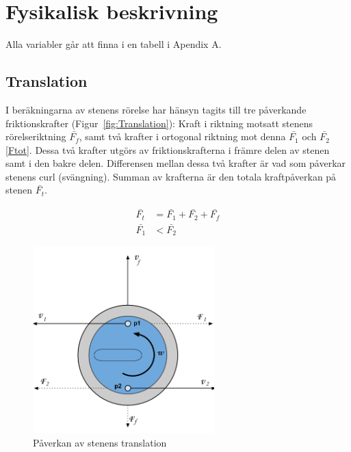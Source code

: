 \documentclass[11pt]{article} %
\begin{document}
\pagebreak

\section{Fysikalisk beskrivning} 

Alla variabler går att finna i en tabell i Apendix A.

\subsection{Translation}

I beräkningarna av stenens rörelse har hänsyn tagits till tre påverkande friktionskrafter (Figur~\ref{fig:Translation}): Kraft i riktning motsatt stenens rörelseriktning $\bar{F_f}$, samt två krafter i ortogonal riktning mot denna $\bar{F_1}$ och $\bar{F_2}$ \eqref{Ftot}. Dessa två krafter utgörs av friktionskrafterna i främre delen av stenen samt i den bakre delen. Differensen mellan dessa två krafter är vad som påverkar stenens curl (svängning). Summan av krafterna är den totala kraftpåverkan på stenen $\bar{F_t}$.

\begin{subequations}\label{Ftot}
 \begin{align}
 \bar{F_t}&=\bar{F_1}+\bar{F_2}+\bar{F_f}\\
 \bar{F_1}&<\bar{F_2}
 \end{align}
 \end{subequations}

\begin{figure}[ht!]
\centering
\includegraphics[width=70mm]{Translation.png}
\caption{Påverkan av stenens translation}
\label{fig:Translation}
\label{overflow}
\end{figure}
\end{document}
